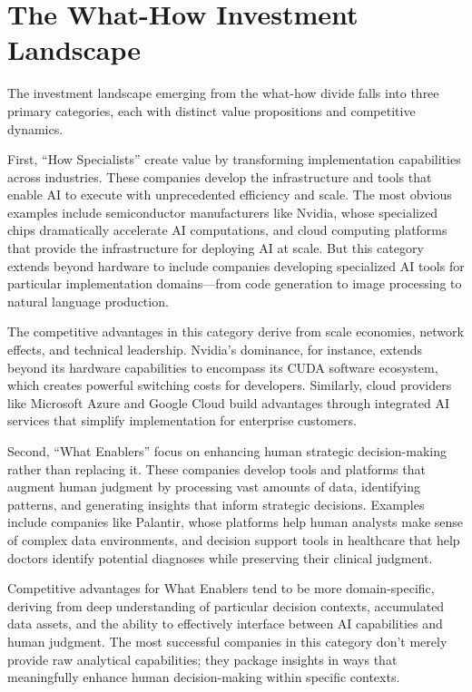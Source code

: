 \documentclass[
  Letterpaper,
]{scrbook}
\begin{document}
\section{The What-How Investment
Landscape}\label{the-what-how-investment-landscape}

The investment landscape emerging from the what-how divide falls into
three primary categories, each with distinct value propositions and
competitive dynamics.

First, ``How Specialists'' create value by transforming implementation
capabilities across industries. These companies develop the
infrastructure and tools that enable AI to execute with unprecedented
efficiency and scale. The most obvious examples include semiconductor
manufacturers like Nvidia, whose specialized chips dramatically
accelerate AI computations, and cloud computing platforms that provide
the infrastructure for deploying AI at scale. But this category extends
beyond hardware to include companies developing specialized AI tools for
particular implementation domains---from code generation to image
processing to natural language production.

The competitive advantages in this category derive from scale economies,
network effects, and technical leadership. Nvidia's dominance, for
instance, extends beyond its hardware capabilities to encompass its CUDA
software ecosystem, which creates powerful switching costs for
developers. Similarly, cloud providers like
Microsoft Azure and
Google Cloud build advantages through
integrated AI services that simplify implementation for enterprise
customers.

Second, ``What Enablers'' focus on enhancing human strategic
decision-making rather than replacing
it. These companies develop tools and platforms that augment human
judgment by processing vast
amounts of data, identifying patterns, and generating insights that
inform strategic decisions. Examples include companies like
Palantir, whose platforms help human
analysts make sense of complex data environments, and decision support
tools in healthcare that help doctors identify
potential diagnoses while preserving their clinical judgment.

Competitive advantages for What Enablers tend to be more
domain-specific, deriving from deep understanding of particular decision
contexts, accumulated data assets, and the ability to effectively
interface between AI capabilities and human judgment. The most
successful companies in this category don't merely provide raw
analytical capabilities; they package insights in ways that meaningfully
enhance human decision-making within specific contexts.
\end{document}
